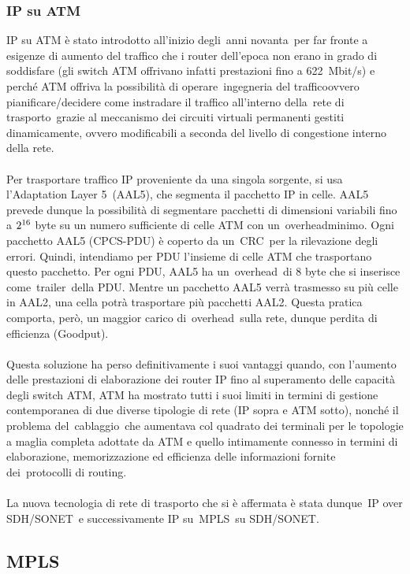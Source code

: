 \documentclass[8pt]{extarticle}
\begin{document}
\subsubsection{IP su ATM}
IP su ATM è stato introdotto all'inizio degli anni novanta per far fronte a esigenze di aumento del 
traffico che i router dell'epoca non erano in grado di soddisfare (gli switch ATM offrivano infatti 
prestazioni fino a 622 Mbit/s) e perché ATM offriva la possibilità di operare ingegneria del trafficoovvero 
pianificare/decidere come instradare il traffico all'interno della rete di trasporto grazie al meccanismo 
dei circuiti virtuali permanenti gestiti dinamicamente, ovvero modificabili a seconda del livello di 
congestione interno della rete.\\\\
Per trasportare traffico IP proveniente da una singola sorgente, si usa l'Adaptation Layer 5 (AAL5), 
che segmenta il pacchetto IP in celle. AAL5 prevede dunque la possibilità di segmentare pacchetti di 
dimensioni variabili fino a $2\textsuperscript{16}$ byte su un numero sufficiente di celle ATM con un overheadminimo. 
Ogni pacchetto AAL5 (CPCS-PDU) è coperto da un CRC per la rilevazione degli errori. Quindi, intendiamo 
per PDU l'insieme di celle ATM che trasportano questo pacchetto. Per ogni PDU, AAL5 ha un overhead di 8 
byte che si inserisce come trailer della PDU. Mentre un pacchetto AAL5 verrà trasmesso su più celle in 
AAL2, una cella potrà trasportare più pacchetti AAL2. Questa pratica comporta, però, un maggior carico 
di overhead sulla rete, dunque perdita di efficienza (Goodput).\\\\
Questa soluzione ha perso definitivamente i suoi vantaggi quando, con l'aumento delle prestazioni di 
elaborazione dei router IP fino al superamento delle capacità degli switch ATM, ATM ha mostrato tutti 
i suoi limiti in termini di gestione contemporanea di due diverse tipologie di rete (IP sopra e ATM 
sotto), nonché il problema del cablaggio che aumentava col quadrato dei terminali per le topologie 
a maglia completa adottate da ATM e quello intimamente connesso in termini di elaborazione, 
memorizzazione ed efficienza delle informazioni fornite dei protocolli di routing.\\\\
La nuova tecnologia di rete di trasporto che si è affermata è stata dunque IP over SDH/SONET e 
successivamente IP su MPLS su SDH/SONET.
\subsection{MPLS}
\end{document}
